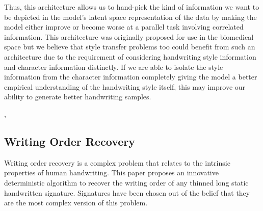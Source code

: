 \documentclass[10pt,twocolumn,letterpaper]{article}
\begin{document}
Thus, this architecture allows us to hand-pick the kind of information we want to be depicted in the model's latent space representation of the data by making the model either improve or become worse at a parallel task involving correlated information. This architecture was originally proposed for use in the biomedical space but we believe that style transfer problems too could benefit from such an architecture due to the requirement of considering handwriting style information and character information distinctly. If we are able to isolate the style information from the character information completely giving the model a better empirical understanding of the handwriting style itself, this may improve our ability to generate better handwriting samples.

,\vspace*{-1em}

\subsection{Writing Order Recovery\cite{WOR}}
\label{sec:wor_det}
Writing order recovery is a complex problem that relates to the intrinsic properties of human handwriting. This paper \cite{WOR} proposes an innovative deterministic algorithm to recover the writing order of any thinned long static handwritten signature. Signatures have been chosen out of the belief that they are the most complex version of this problem.
\end{document}
